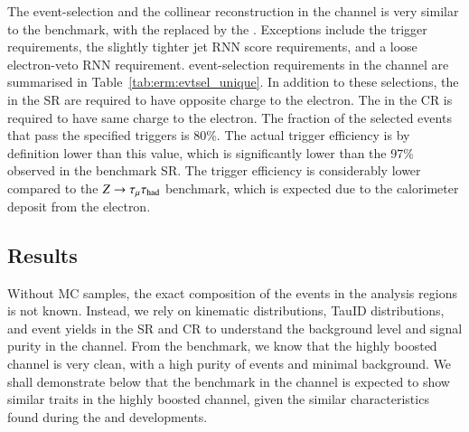         The event-selection and the \teth collinear reconstruction in the \Zttehad channel is very similar to 
        the \tauhadmurm benchmark, with the \tauhadmurm replaced by the \tauhaderm. 
        Exceptions include the trigger requirements, the slightly tighter jet RNN score requirements, 
        and a loose electron-veto RNN requirement.
        event-selection requirements in the \Zttehad channel are summarised in Table~\ref{tab:erm:evtsel_unique}. 
        In addition to these selections, the \tauhaderm in the SR are required to have 
        opposite charge to the electron. 
        The \tauhaderm in the CR is required to have same charge to the electron. 
        The fraction of the selected events that pass the specified triggers is 80\%. 
        The actual trigger efficiency is by definition lower than this value, 
        which is significantly lower than the 97\% observed in the \tmth benchmark SR.
        The \MET trigger efficiency is considerably lower compared to the $Z\rightarrow\tau_\mathrm{\mu}\tau_{\text{had}}$
        benchmark, which is expected due to the calorimeter deposit from the electron.
        
    \subsection{Results}
    Without MC samples, the exact composition of the events in the analysis regions is not known. 
    Instead, we rely on kinematic distributions, TauID distributions, and event yields in the SR and CR
    to understand the background level and signal purity in the \Zttehad channel. 
    From the \tauhadmurm benchmark, we know that the highly boosted \Zttmuhad channel is very clean, 
    with a high purity of \tmth events and minimal background. 
    We shall demonstrate below that the \tauhaderm benchmark in the 
    \Zttehad channel is expected to show similar traits in the highly
    boosted \Zttehad channel, given the similar characteristics found during the
    \tauhaderm and \tauhadmurm developments.

